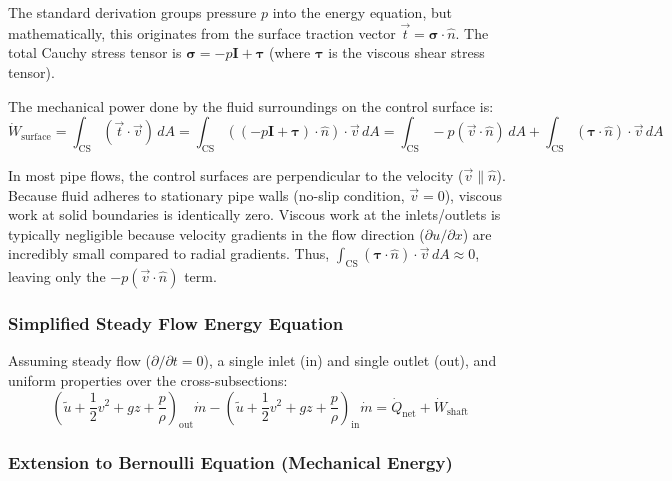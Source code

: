 \begin{expertbox}
The standard derivation groups pressure $p$ into the energy equation, but mathematically, this originates from the surface traction vector $\vec{t} = \boldsymbol{\sigma} \cdot \hat{n}$. The total Cauchy stress tensor is $\boldsymbol{\sigma} = -p\mathbf{I} + \boldsymbol{\tau}$ (where $\boldsymbol{\tau}$ is the viscous shear stress tensor).

The mechanical power done by the fluid surroundings on the control surface is:
\begin{equation}
    \dot{W}_{\text{surface}} = \int_{\text{CS}} (\vec{t} \cdot \vec{v}) \, dA = \int_{\text{CS}} ((-p\mathbf{I} + \boldsymbol{\tau}) \cdot \hat{n}) \cdot \vec{v} \, dA = \int_{\text{CS}} -p(\vec{v} \cdot \hat{n}) \, dA + \int_{\text{CS}} (\boldsymbol{\tau} \cdot \hat{n}) \cdot \vec{v} \, dA
\end{equation}

In most pipe flows, the control surfaces are perpendicular to the velocity ($\vec{v} \parallel \hat{n}$). Because fluid adheres to stationary pipe walls (no-slip condition, $\vec{v}=0$), viscous work at solid boundaries is identically zero. Viscous work at the inlets/outlets is typically negligible because velocity gradients in the flow direction ($\partial u / \partial x$) are incredibly small compared to radial gradients. Thus, $\int_{\text{CS}} (\boldsymbol{\tau} \cdot \hat{n}) \cdot \vec{v} \, dA \approx 0$, leaving only the $-p(\vec{v} \cdot \hat{n})$ term.
\end{expertbox}

\subsubsection{Simplified Steady Flow Energy Equation}

Assuming steady flow ($\partial / \partial t = 0$), a single inlet (in) and single outlet (out), and uniform properties over the cross-subsections:
\begin{equation}
    \left( \tilde{u} + \frac{1}{2}v^2 + gz + \frac{p}{\rho} \right)_{\text{out}} \dot{m} - \left( \tilde{u} + \frac{1}{2}v^2 + gz + \frac{p}{\rho} \right)_{\text{in}} \dot{m} = \dot{Q}_{\text{net}} + \dot{W}_{\text{shaft}}
\end{equation}

\subsubsection{Extension to Bernoulli Equation (Mechanical Energy)}

